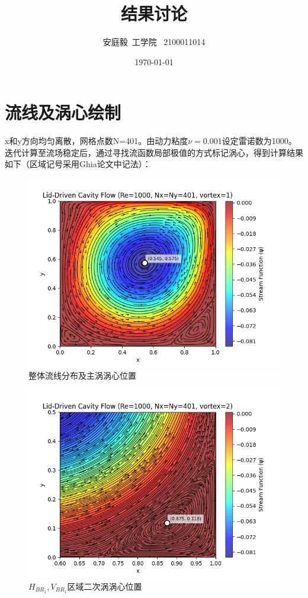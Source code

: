\documentclass[12pt, a4paper]{article}
\title{结果讨论}
\author{安庭毅\ 工学院 \ 2100011014}
\date{\today} %
\begin{document}
\maketitle %
\section{流线及涡心绘制}
x和y方向均匀离散，网格点数N=401。由动力粘度$\nu = 0.001$设定雷诺数为1000。迭代计算至流场稳定后，通过寻找流函数局部极值的方式标记涡心，得到计算结果如下（区域记号采用Ghia论文中记法）：
\begin{figure}[htbp]
    \centering
    \includegraphics[width=\textwidth]{pictures/streamline_vortex_1.png}
    \caption{整体流线分布及主涡涡心位置}
\end{figure}

\begin{figure}[htbp]
    \centering
    \includegraphics[width=\textwidth]{pictures/streamline_vortex_2.png}
    \caption{$H_{BR_{1}},V_{BR_{1}}$区域二次涡涡心位置}
\end{figure}
\end{document}
